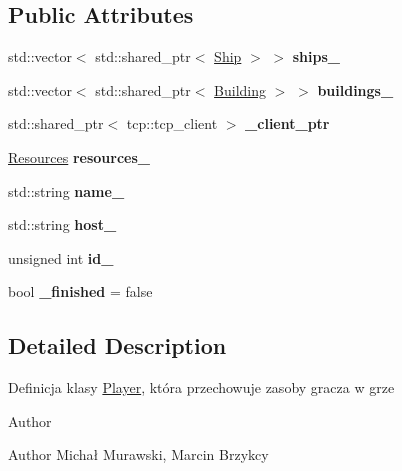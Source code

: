 \subsection*{Public Attributes}
\begin{DoxyCompactItemize}
\item 
std\+::vector$<$ std\+::shared\+\_\+ptr$<$ \hyperlink{classShip}{Ship} $>$ $>$ {\bfseries ships\+\_\+}\hypertarget{classPlayer_a52ebeef62bb950415a79909a6d50f6f7}{}\label{classPlayer_a52ebeef62bb950415a79909a6d50f6f7}

\item 
std\+::vector$<$ std\+::shared\+\_\+ptr$<$ \hyperlink{classBuilding}{Building} $>$ $>$ {\bfseries buildings\+\_\+}\hypertarget{classPlayer_ae9978fe9975e3d4f953a3b227af8b2f7}{}\label{classPlayer_ae9978fe9975e3d4f953a3b227af8b2f7}

\item 
std\+::shared\+\_\+ptr$<$ tcp\+::tcp\+\_\+client $>$ {\bfseries \+\_\+client\+\_\+ptr}\hypertarget{classPlayer_ae4887553567f66c9114eeede1123cee8}{}\label{classPlayer_ae4887553567f66c9114eeede1123cee8}

\item 
\hyperlink{classResources}{Resources} {\bfseries resources\+\_\+}\hypertarget{classPlayer_a45a1c81404c7622e80eba7dede5a2a36}{}\label{classPlayer_a45a1c81404c7622e80eba7dede5a2a36}

\item 
std\+::string {\bfseries name\+\_\+}\hypertarget{classPlayer_ae48b626fa81cdf4fe831c20122287649}{}\label{classPlayer_ae48b626fa81cdf4fe831c20122287649}

\item 
std\+::string {\bfseries host\+\_\+}\hypertarget{classPlayer_a4fb6eccf87c3555f2023ed519c88e9ef}{}\label{classPlayer_a4fb6eccf87c3555f2023ed519c88e9ef}

\item 
unsigned int {\bfseries id\+\_\+}\hypertarget{classPlayer_a37144a57b1fb28ef20eea5fff1d8d506}{}\label{classPlayer_a37144a57b1fb28ef20eea5fff1d8d506}

\item 
bool {\bfseries \+\_\+finished} = false\hypertarget{classPlayer_a8c8bf83771c911c579908d57d20e4255}{}\label{classPlayer_a8c8bf83771c911c579908d57d20e4255}

\end{DoxyCompactItemize}


\subsection{Detailed Description}
Definicja klasy \hyperlink{classPlayer}{Player}, która przechowuje zasoby gracza w grze \begin{DoxyAuthor}{Author}

\end{DoxyAuthor}
\begin{DoxyParagraph}{Author}
Michał Murawski, Marcin Brzykcy 
\end{DoxyParagraph}


